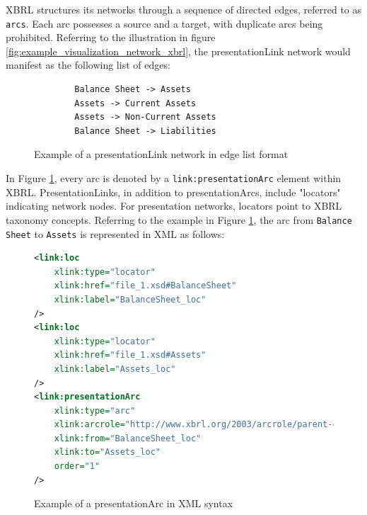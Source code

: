 XBRL structures its networks through a sequence of directed edges, referred to as \texttt{arcs}.
Each arc possesses a source and a target, with duplicate arcs being prohibited.
Referring to the illustration in figure \ref{fig:example_visualization_network_xbrl},
the presentationLink network would manifest as the following list of edges:

\begin{figure}[H]
    \caption{Example of a presentationLink network in edge list format}
    \label{fig:example_visualization_network_xbrl_edge_list}
    \begin{verbatim}
        Balance Sheet -> Assets
        Assets -> Current Assets
        Assets -> Non-Current Assets
        Balance Sheet -> Liabilities
    \end{verbatim}
\end{figure}


In Figure \ref{fig:example_visualization_network_xbrl_edge_list}, every arc is denoted by a \texttt{link:presentationArc} element within XBRL.
PresentationLinks, in addition to presentationArcs, include "locators" indicating network nodes.
For presentation networks, locators point to XBRL taxonomy concepts.
Referring to the example in Figure \ref{fig:example_visualization_network_xbrl_edge_list},
the arc from \texttt{Balance Sheet} to \texttt{Assets} is represented in XML as follows:

\begin{figure}[H]
    \centering
    \begin{lstlisting}[language=XML, basicstyle=\small\ttfamily]
<link:loc 
    xlink:type="locator" 
    xlink:href="file_1.xsd#BalanceSheet"
    xlink:label="BalanceSheet_loc"
/>
<link:loc 
    xlink:type="locator" 
    xlink:href="file_1.xsd#Assets"
    xlink:label="Assets_loc"
/>
<link:presentationArc 
    xlink:type="arc" 
    xlink:arcrole="http://www.xbrl.org/2003/arcrole/parent-child" 
    xlink:from="BalanceSheet_loc" 
    xlink:to="Assets_loc"
    order="1"
/>
\end{lstlisting}
    \caption{Example of a presentationArc in XML syntax}
    \label{fig:example_presentation_arc_xml}
\end{figure}

